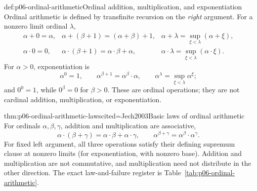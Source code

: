 \begin{hbdefinition}{def:p06-ordinal-arithmetic}{Ordinal addition, multiplication, and exponentiation}
Ordinal arithmetic is defined by transfinite recursion on the \emph{right}
argument.  For a nonzero limit ordinal \(\lambda\),
\[
\begin{array}{lll}
 \alpha+0=\alpha,
 &\alpha+(\beta+1)=(\alpha+\beta)+1,
 &\alpha+\lambda=\sup_{\xi<\lambda}(\alpha+\xi),\\[2pt]
 \alpha\cdot0=0,
 &\alpha\cdot(\beta+1)=\alpha\cdot\beta+\alpha,
 &\alpha\cdot\lambda=\sup_{\xi<\lambda}(\alpha\cdot\xi).
\end{array}
\]
For \(\alpha>0\), exponentiation is
\[
 \alpha^0=1,
 \qquad
 \alpha^{\beta+1}=\alpha^\beta\cdot\alpha,
 \qquad
 \alpha^\lambda=\sup_{\xi<\lambda}\alpha^\xi;
\]
and \(0^0=1\), while \(0^\beta=0\) for \(\beta>0\).  These are ordinal
operations; they are not cardinal addition, multiplication, or exponentiation.
\end{hbdefinition}

\begin{hbtheorem}{thm:p06-ordinal-arithmetic-laws}{cited=Jech2003}{Basic laws of ordinal arithmetic}
For ordinals \(\alpha,\beta,\gamma\), addition and multiplication are
associative,
\[
 \alpha\cdot(\beta+\gamma)=
 \alpha\cdot\beta+\alpha\cdot\gamma,
 \qquad
 \alpha^{\beta+\gamma}=\alpha^\beta\cdot\alpha^\gamma.
\]
For fixed left argument, all three operations satisfy their defining supremum
clause at nonzero limits (for exponentiation, with nonzero base).  Addition and
multiplication are not commutative, and multiplication need not distribute in
the other direction.  The exact law-and-failure register is
Table~\ref{tab:p06-ordinal-arithmetic}.
\end{hbtheorem}

